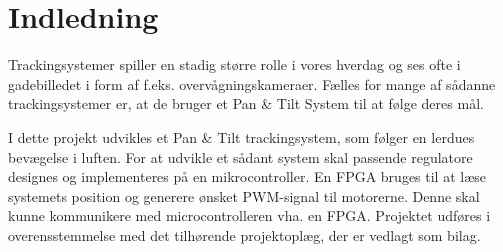 \section*{Indledning}
Trackingsystemer spiller en stadig større rolle i vores hverdag og ses ofte i gadebilledet i form 
af f.eks. overvågningskameraer.
Fælles for mange af sådanne trackingsystemer er, at de bruger et Pan \& Tilt System til at følge deres mål. 

I dette projekt udvikles et Pan \& Tilt trackingsystem, som følger en lerdues bevægelse i 
luften. For at udvikle et sådant system skal passende regulatore designes og implementeres
på en mikrocontroller. 
En FPGA  bruges til at læse systemets position og generere ønsket PWM-signal til motorerne. 
Denne skal kunne kommunikere med microcontrolleren vha. en FPGA. 
Projektet udføres i overensstemmelse med det tilhørende projektoplæg, der er vedlagt 
som bilag.
